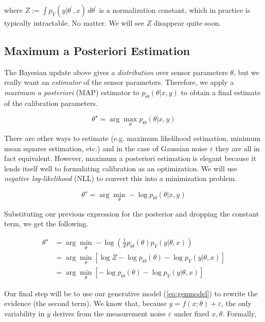 \documentclass[conference]{IEEEtran}
\begin{document}
where \( Z := \int p_Y(y | \theta^\prime, x) \, d\theta^\prime\) is a normalization constant, which in practice is typically intractable.  No matter.  We will see \( Z \) disappear quite soon.

\subsection{Maximum a Posteriori Estimation}

The Bayesian update above gives a \textit{distribution} over sensor parameters \( \theta \), but we really want an \textit{estimator} of the sensor parameters.  Therefore, we apply a \textit{maximum a posteriori} (MAP) estimator to \( p_\Theta(\theta | x, y) \) to obtain a final estimate of the calibration parameters.

\begin{equation}
	\theta^\star = \arg\max_\theta p_\Theta(\theta | x, y)
\end{equation}

There are other ways to estimate (e.g. maximum likelihood estimation, minimum mean squares estimation, etc.) and in the case of Gaussian noise \( \varepsilon \) they are all in fact equivalent.  However, maximum a posteriori estimation is elegant because it lends itself well to formulating calibration as an optimization.  We will use \textit{negative log-likelihood} (NLL) to convert this into a minimization problem.

\begin{equation}
	\theta^\star = \arg\min_\theta -\log p_\Theta(\theta | x, y)
\end{equation}

Substituting our previous expression for the posterior and dropping the constant term, we get the following.

\begin{align}
	\theta^\star &= \arg\min_\theta -\log(\frac1Z p_\Theta(\theta) p_Y(y | \theta, x)) \\
	&= \arg\min_\theta \left[ \log Z - \log p_\Theta(\theta) - \log p_Y(y | \theta, x) \right] \\
	&= \arg\min_\theta \left[ - \log p_\Theta(\theta) - \log p_Y(y | \theta, x) \right]
\end{align}

Our final step will be to use our generative model (\ref{eq:genmodel}) to rewrite the evidence (the second term).  We know that, because \( y = f(x; \theta) + \varepsilon \), the only variability in \( y \) derives from the measurement noise \( \varepsilon \) under fixed \( x, \theta \).  Formally,
\end{document}
